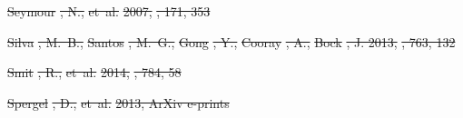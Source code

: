 \documentclass[numberedappendix]{emulateapj}
\providecommand{\DIFdel}[1]{{\protect\color{red}\sout{#1}}}                      %
\begin{document}
\DIFdel{Seymour}%
\DIFdel{, N., }%
\DIFdel{et~al.}%
\DIFdel{2007, }%
\DIFdel{, 171, 353
}%

\DIFdel{Silva}%
\DIFdel{, M.~B., }%
\DIFdel{Santos}%
\DIFdel{, M.~G., }%
\DIFdel{Gong}%
\DIFdel{, Y., }%
\DIFdel{Cooray}%
\DIFdel{, A., }%
\DIFdel{Bock}%
\DIFdel{, J. 2013,
  }%
\DIFdel{, 763, 132
}%

\DIFdel{Smit}%
\DIFdel{, R., }%
\DIFdel{et~al.}%
\DIFdel{2014, }%
\DIFdel{, 784, 58
}%

\DIFdel{Spergel}%
\DIFdel{, D., }%
\DIFdel{et~al.}%
\DIFdel{2013, ArXiv e-prints
}%
\end{document}
